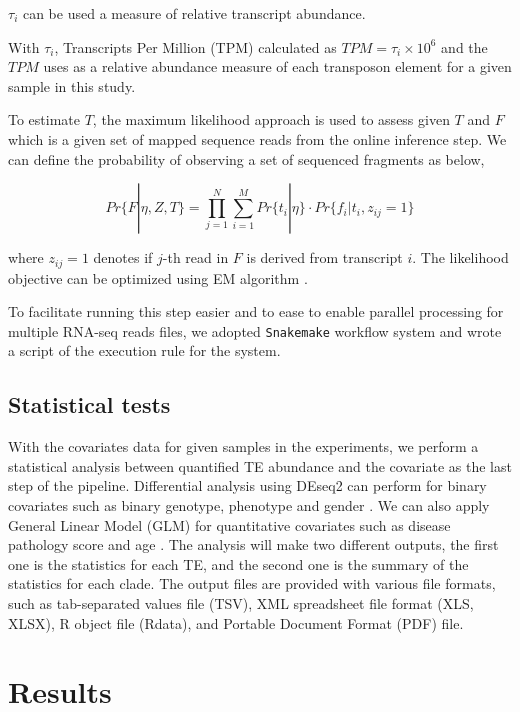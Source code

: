 \documentclass{ws-procs11x85}
\begin{document}
$\tau_i$ can be used a measure of relative transcript abundance.

With $\tau_i$, Transcripts Per Million (TPM) calculated as $TPM=\tau_i \times 10^6$ and the $TPM$ uses as a relative abundance measure of each transposon element for a given sample in this study.

To estimate $T$, the maximum likelihood approach is used to assess given $T$ and $F$ which is a given set of mapped sequence reads from 
the online inference step.
We can define the probability of observing a set of sequenced fragments as below,

\begin{equation} \label{eq:3}
Pr\{F|\eta,Z, T \}=
\prod_{j=1}^{N}\sum_{i=1}^{M} Pr\{ t_i | \eta \}  \cdot
 Pr \{ f_i | t_i , z_{ij} = 1 \}
\end{equation}

where $z_{ij} = 1$ denotes if $j$-th read in $F$ is derived from transcript $i$. The likelihood objective can be optimized using EM algorithm \cite{li2009rna}.

To facilitate running this step easier and to ease to enable parallel processing for multiple RNA-seq reads files, we adopted \verb|Snakemake| workflow system and wrote a script of the execution rule for the system.\cite{koster2012snakemake}

\subsection{Statistical tests}

With the covariates data for given samples in the experiments, 
we perform a statistical analysis between quantified TE abundance and the covariate as the last step of the pipeline. 
Differential analysis using DEseq2 can perform for binary covariates such as binary genotype, phenotype and gender \cite{love2014moderated}. We can also apply General Linear Model (GLM) for quantitative covariates such as disease pathology score and age \cite{johnston1980multivariate}. The analysis will make two different outputs, 
the first one is the statistics for each TE, and the second one is the summary of the statistics for each clade. 
The output files are provided with various file formats, such as tab-separated values file (TSV), XML spreadsheet file format (XLS, XLSX), R object file (Rdata), and Portable Document Format (PDF) file.

\section{Results}
\end{document}
